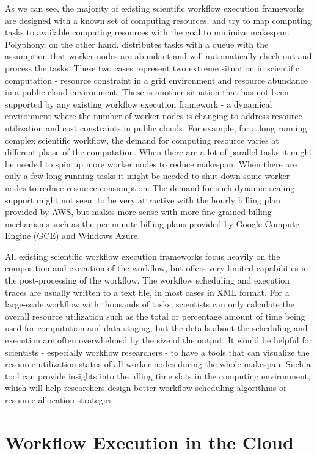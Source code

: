 As we can see, the majority of existing scientific workflow execution frameworks are designed with a known set of computing resources, and try to map computing tasks to available computing resources with the goal to minimize makespan. Polyphony, on the other hand, distributes tasks with a queue with the assumption that worker nodes are abundant and will automatically check out and process the tasks. These two cases represent two extreme situation in scientific computation - resource constraint in a grid environment and resource abundance in a public cloud environment. These is another situation that has not been supported by any existing workflow execution framework - a dynamical environment where the number of worker nodes is changing to address resource utilization and cost constraints in public clouds. For example, for a long running complex scientific workflow, the demand for computing resource varies at different phase of the computation. When there are a lot of parallel tasks it might be needed to spin up more worker nodes to reduce makespan. When there are only a few long running tasks it might be needed to shut down some worker nodes to reduce resource consumption. The demand for such dynamic scaling support might not seem to be very attractive with the hourly billing plan provided by AWS, but makes more sense with more fine-grained billing mechanisms such as the per-minute billing plans provided by Google Compute Engine (GCE) and Windows Azure.  

All existing scientific workflow execution frameworks focus heavily on the composition and execution of the workflow, but offers very limited capabilities in the post-processing of the workflow. The workflow scheduling and execution traces are usually written to a text file, in most cases in XML format. For a large-scale workflow with thousands of tasks, scientists can only calculate the overall resource utilization such as the total or percentage amount of time being used for computation and data staging, but the details about the scheduling and execution are often overwhelmed by the size of the output. It would be helpful for scientists - especially workflow researchers - to have a tools that can visualize the resource utilization status of all worker nodes during the whole makespan. Such a tool can provide insights into the idling time slots in the computing environment, which will help researchers design better workflow scheduling algorithms or resource allocation strategies.

\section{Workflow Execution in the Cloud}
\label{sec:workflow_execution_cloud}


